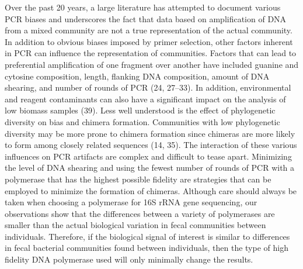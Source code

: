 \documentclass[11pt,]{article}
\begin{document}
Over the past 20 years, a large literature has attempted to document
various PCR biases and underscores the fact that data based on
amplification of DNA from a mixed community are not a true
representation of the actual community. In addition to obvious biases
imposed by primer selection, other factors inherent in PCR can influence
the representation of communities. Factors that can lead to preferential
amplification of one fragment over another have included guanine and
cytosine composition, length, flanking DNA composition, amount of DNA
shearing, and number of rounds of PCR (24, 27--33). In addition,
environmental and reagent contaminants can also have a significant
impact on the analysis of low biomass samples (39). Less well understood
is the effect of phylogenetic diversity on bias and chimera formation.
Communities with low phylogenetic diversity may be more prone to chimera
formation since chimeras are more likely to form among closely related
sequences (14, 35). The interaction of these various influences on PCR
artifacts are complex and difficult to tease apart. Minimizing the level
of DNA shearing and using the fewest number of rounds of PCR with a
polymerase that has the highest possible fidelity are strategies that
can be employed to minimize the formation of chimeras. Although care
should always be taken when choosing a polymerase for 16S rRNA gene
sequencing, our observations show that the differences between a variety
of polymerases are smaller than the actual biological variation in fecal
communities between individuals. Therefore, if the biological signal of
interest is similar to differences in fecal bacterial communities found
between individuals, then the type of high fidelity DNA polymerase used
will only minimally change the results.
\end{document}
